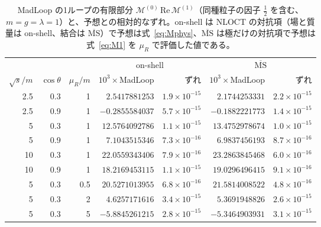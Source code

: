\documentclass[a4paper,10pt]{ltjsarticle}
\begin{document}
\begin{table}[tbp]
\centering\small
\caption{MadLoop の1ループの有限部分 $\mathcal{M}^{(0)}\,\mathrm{Re}\,\mathcal{M}^{(1)}$（同種粒子の因子 $\frac12$ を含む、$m=g=\lambda=1$）と、予想との相対的なずれ。on-shell は NLOCT の対抗項（場と質量は on-shell、結合は $\overline{\mathrm{MS}}$）で予想は式~\eqref{eq:Mphys}、$\overline{\mathrm{MS}}$ は極だけの対抗項で予想は式~\eqref{eq:M1} を $\mu_R$ で評価した値である。}
\label{tab:madloop}
\begin{tabular}{rrrrrrr}
\toprule
& & & \multicolumn{2}{c}{on-shell} & \multicolumn{2}{c}{$\overline{\mathrm{MS}}$} \\
\cmidrule(lr){4-5}\cmidrule(lr){6-7}
$\sqrt s/m$ & $\cos\theta$ & $\mu_R/m$ & $10^3\times$MadLoop & ずれ & $10^3\times$MadLoop & ずれ \\
\midrule
2.5 & 0.3 & 1 & $2.5417881253$ & $1.9\times10^{-15}$ & $2.1744253331$ & $2.2\times10^{-15}$ \\
2.5 & 0.9 & 1 & $-0.2855584037$ & $5.7\times10^{-15}$ & $-0.1882221773$ & $1.4\times10^{-15}$ \\
5 & 0.3 & 1 & $12.5764092786$ & $1.1\times10^{-15}$ & $13.4752978674$ & $1.0\times10^{-15}$ \\
5 & 0.9 & 1 & $7.1043515346$ & $7.3\times10^{-16}$ & $6.9837456193$ & $8.7\times10^{-16}$ \\
10 & 0.3 & 1 & $22.0559343406$ & $7.9\times10^{-16}$ & $23.2863845468$ & $6.0\times10^{-16}$ \\
10 & 0.9 & 1 & $18.2169453115$ & $1.1\times10^{-15}$ & $19.0296496415$ & $9.1\times10^{-16}$ \\
5 & 0.3 & 0.5 & $20.5271013955$ & $6.8\times10^{-16}$ & $21.5814008522$ & $4.8\times10^{-16}$ \\
5 & 0.3 & 2 & $4.6257171616$ & $3.4\times10^{-15}$ & $5.3691948826$ & $2.6\times10^{-15}$ \\
5 & 0.3 & 5 & $-5.8845261215$ & $2.8\times10^{-15}$ & $-5.3464903931$ & $3.1\times10^{-15}$ \\
\bottomrule
\end{tabular}
\end{table}
\end{document}
